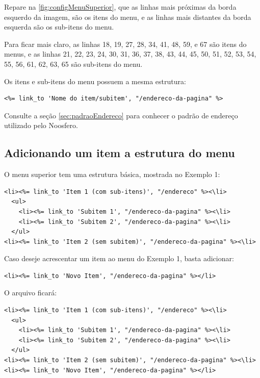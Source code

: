 Repare na \ref{fig:configMenuSuperior}, que as linhas mais próximas da borda esquerdo da imagem, são os itens do menu, e as linhas mais distantes da borda esquerda são os sub-itens do menu.

Para ficar mais claro, as linhas 18, 19, 27, 28, 34, 41, 48, 59, e 67 são itens do menus, e as linhas 21, 22, 23, 24, 30, 31, 36, 37, 38, 43, 44, 45, 50, 51, 52, 53, 54, 55, 56, 61, 62, 63, 65 são sub-itens do menu.

Os itens e sub-itens do menu possuem a mesma estrutura:

\begin{verbatim}
<%= link_to 'Nome do item/subitem', "/endereco-da-pagina" %>
\end{verbatim}

Consulte a seção \ref{sec:padraoEndereco} para conhecer o padrão de endereço utilizado pelo Noosfero.

\newpage
\subsection{Adicionando um item a estrutura do menu}

O menu superior tem uma estrutura básica, mostrada no Exemplo 1:

\begin{verbatim}
<li><%= link_to 'Item 1 (com sub-itens)', "/endereco" %><\li>
  <ul>
    <li><%= link_to 'Subitem 1', "/endereco-da-pagina" %><\li>
    <li><%= link_to 'Subitem 2', "/endereco-da-pagina" %><\li>
  </ul>
<li><%= link_to 'Item 2 (sem subitem)', "/endereco-da-pagina" %><\li>
\end{verbatim}

Caso deseje acrescentar um item ao menu do Exemplo 1, basta adicionar:

\begin{verbatim}
<li><%= link_to 'Novo Item', "/endereco-da-pagina" %></li>
\end{verbatim}

O arquivo ficará:

\begin{verbatim}
<li><%= link_to 'Item 1 (com sub-itens)', "/endereco" %><\li>
  <ul>
    <li><%= link_to 'Subitem 1', "/endereco-da-pagina" %><\li>
    <li><%= link_to 'Subitem 2', "/endereco-da-pagina" %><\li>
  </ul>
<li><%= link_to 'Item 2 (sem subitem)', "/endereco-da-pagina" %><\li>
<li><%= link_to 'Novo Item', "/endereco-da-pagina" %></li>
\end{verbatim}

